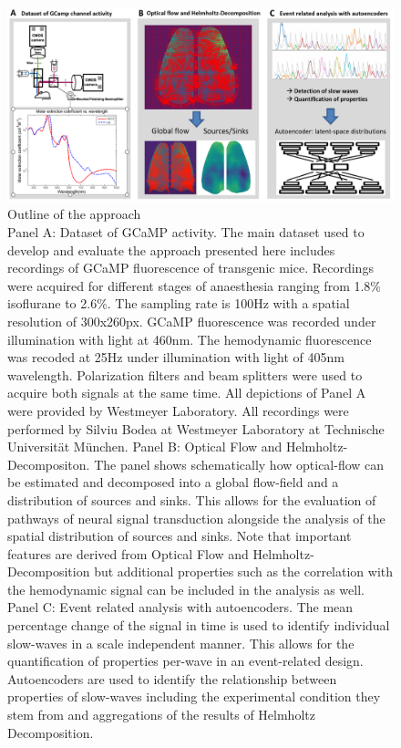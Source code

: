 \begin{figure}[!htb]
\centering
\includegraphics[width=\textwidth,height=\textheight,keepaspectratio]{Figures/outline_approach}
\decoRule
\caption[Outline of the approach]{Outline of the approach\\Panel A: Dataset of GCaMP activity. The main dataset used to develop and evaluate the approach presented here includes recordings of GCaMP fluorescence of transgenic mice. Recordings were acquired for different stages of anaesthesia ranging from 1.8\% isoflurane to 2.6\%. The sampling rate is 100Hz with a spatial resolution of 300x260px. GCaMP fluorescence was recorded under illumination with light at 460nm. The hemodynamic fluorescence was recoded at 25Hz under illumination with light of 405nm wavelength. Polarization filters and beam splitters were used to acquire both signals at the same time. All depictions of Panel A were provided by Westmeyer Laboratory. All recordings were performed by Silviu Bodea at Westmeyer Laboratory at Technische Universität München. Panel B: Optical Flow and Helmholtz-Decompositon. The panel shows schematically how optical-flow can be estimated and decomposed into a global flow-field and a distribution of sources and sinks. This allows for the evaluation of pathways of neural signal transduction alongside the analysis of the spatial distribution of sources and sinks. Note that important features are derived from Optical Flow and Helmholtz-Decomposition but additional properties such as the correlation with the hemodynamic signal can be included in the analysis as well. Panel C: Event related analysis with autoencoders. The mean percentage change of the signal in time is used to identify individual slow-waves in a scale independent manner. This allows for the quantification of properties per-wave in an event-related design. Autoencoders are used to identify the relationship between properties of slow-waves including the experimental condition they stem from and aggregations of the results of Helmholtz Decomposition.}
\label{fig:outline_approach}
\end{figure}
